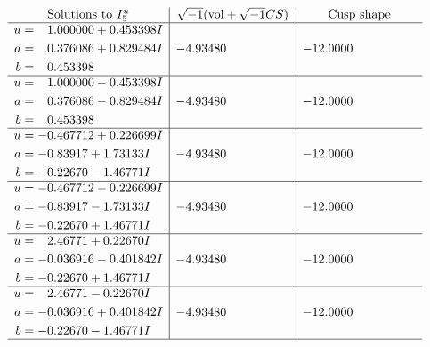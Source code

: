 \documentclass[1p]{elsarticle_modified}
\theoremstyle{definition}
\newcommand{\I}{\sqrt{-1}}
\begin{document}
$$\begin{array}{c|c|c}  
\text{Solutions to }I^u_{5}& \I (\text{vol} + \sqrt{-1}CS) & \text{Cusp shape}\\
 \hline 
\begin{aligned}
u &= \phantom{-}1.000000 + 0.453398 I \\
a &= \phantom{-}0.376086 + 0.829484 I \\
b &= \phantom{-}0.453398\phantom{ +0.000000I}\end{aligned}
 & -4.93480\phantom{ +0.000000I} & -12.0000\phantom{ +0.000000I} \\ \hline\begin{aligned}
u &= \phantom{-}1.000000 - 0.453398 I \\
a &= \phantom{-}0.376086 - 0.829484 I \\
b &= \phantom{-}0.453398\phantom{ +0.000000I}\end{aligned}
 & -4.93480\phantom{ +0.000000I} & -12.0000\phantom{ +0.000000I} \\ \hline\begin{aligned}
u &= -0.467712 + 0.226699 I \\
a &= -0.83917 + 1.73133 I \\
b &= -0.22670 - 1.46771 I\end{aligned}
 & -4.93480\phantom{ +0.000000I} & -12.0000\phantom{ +0.000000I} \\ \hline\begin{aligned}
u &= -0.467712 - 0.226699 I \\
a &= -0.83917 - 1.73133 I \\
b &= -0.22670 + 1.46771 I\end{aligned}
 & -4.93480\phantom{ +0.000000I} & -12.0000\phantom{ +0.000000I} \\ \hline\begin{aligned}
u &= \phantom{-}2.46771 + 0.22670 I \\
a &= -0.036916 - 0.401842 I \\
b &= -0.22670 + 1.46771 I\end{aligned}
 & -4.93480\phantom{ +0.000000I} & -12.0000\phantom{ +0.000000I} \\ \hline\begin{aligned}
u &= \phantom{-}2.46771 - 0.22670 I \\
a &= -0.036916 + 0.401842 I \\
b &= -0.22670 - 1.46771 I\end{aligned}
 & -4.93480\phantom{ +0.000000I} & -12.0000\phantom{ +0.000000I}\\
 \hline 
 \end{array}$$\newpage
\end{document}
